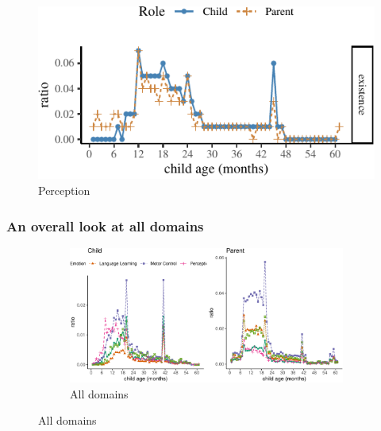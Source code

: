 \documentclass[10pt, letterpaper]{article}
\newenvironment{CodeChunk}{}{}
\begin{document}
\begin{CodeChunk}
\begin{figure}[H]

{\centering \includegraphics{figs/perception-1} 

}

\caption[Perception]{Perception}\label{fig:perception}
\end{figure}
\end{CodeChunk}

\hypertarget{an-overall-look-at-all-domains}{%
\subsubsection{An overall look at all
domains}\label{an-overall-look-at-all-domains}}

\begin{figure}[h]
\begin{CodeChunk}
\begin{figure}[H]

{\centering \includegraphics{figs/all-1} 

}

\caption[All domains]{All domains}\label{fig:all}
\end{figure}
\end{CodeChunk}
\end{figure}
\end{document}

